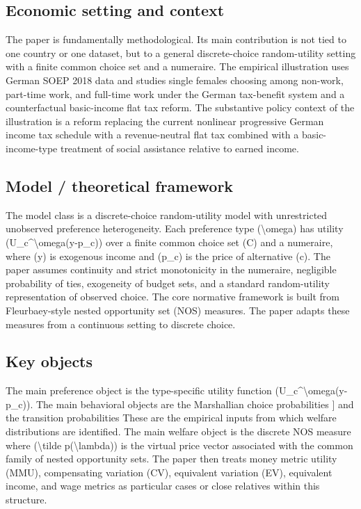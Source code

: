\documentclass[11pt,a4paper]{article}
\begin{document}
\subsection*{Economic setting and context}
The paper is fundamentally methodological. Its main contribution is not tied to one country or one dataset, but to a general discrete-choice random-utility setting with a finite common choice set and a numeraire. The empirical illustration uses German SOEP 2018 data and studies single females choosing among non-work, part-time work, and full-time work under the German tax-benefit system and a counterfactual basic-income flat tax reform. The substantive policy context of the illustration is a reform replacing the current nonlinear progressive German income tax schedule with a revenue-neutral flat tax combined with a basic-income-type treatment of social assistance relative to earned income.

\subsection*{Model / theoretical framework}
The model class is a discrete-choice random-utility model with unrestricted unobserved preference heterogeneity. Each preference type (\textbackslash{}omega) has utility (U\_c\textasciicircum{}\textbackslash{}omega(y-p\_c)) over a finite common choice set (C) and a numeraire, where (y) is exogenous income and (p\_c) is the price of alternative (c). The paper assumes continuity and strict monotonicity in the numeraire, negligible probability of ties, exogeneity of budget sets, and a standard random-utility representation of observed choice. The core normative framework is built from Fleurbaey-style nested opportunity set (NOS) measures. The paper adapts these measures from a continuous setting to discrete choice.

\subsection*{Key objects}
The main preference object is the type-specific utility function (U\_c\textasciicircum{}\textbackslash{}omega(y-p\_c)). The main behavioral objects are the Marshallian choice probabilities ] and the transition probabilities These are the empirical inputs from which welfare distributions are identified. The main welfare object is the discrete NOS measure where (\textbackslash{}tilde p(\textbackslash{}lambda)) is the virtual price vector associated with the common family of nested opportunity sets. The paper then treats money metric utility (MMU), compensating variation (CV), equivalent variation (EV), equivalent income, and wage metrics as particular cases or close relatives within this structure.
\end{document}
